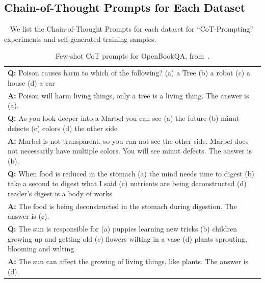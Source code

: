 \documentclass{article} %
\begin{document}
\subsection{Chain-of-Thought Prompts for Each Dataset}~\label{sec:app_prompt}
We list the Chain-of-Thought Prompts for each dataset for ``CoT-Prompting'' experiments and self-generated training samples.


\begin{table}[h]
    \caption{
    Few-shot CoT prompts for OpenBookQA, from~\cite{Wang2022RationaleAugmentedEI}.
    }
    \centering
    \small
    \begin{tabular}{p{14cm}}
        \toprule
        \textbf{Q:} Poison causes harm to which of the following? (a) a Tree (b) a robot (c) a house (d) a car\\
        \vspace{-1mm}
        \textbf{A:} Poison will harm living things, only a tree is a living thing. The answer is (a).\\
        \vspace{0mm}
        \textbf{Q:} As you look deeper into a Marbel you can see (a) the future (b) minut defects (c) colors (d) the other side\\
        \vspace{-1mm}
        \textbf{A:} Marbel is not transparent, so you can not see the other side. Marbel does not necessarily have multiple colors. You will see minut defects. The answer is (b). \\
        \vspace{0mm}
        \textbf{Q:} When food is reduced in the stomach (a) the mind needs time to digest (b) take a second to digest what I said (c) nutrients are being deconstructed (d) reader's digest is a body of works\\
        \vspace{-1mm}
        \textbf{A:} The food is being deconstructed in the stomach during digestion. The answer is (c).\\
        \vspace{0mm}
        \textbf{Q:} The sun is responsible for (a) puppies learning new tricks (b) children growing up and getting old (c) flowers wilting in a vase (d) plants sprouting, blooming and wilting\\
        \vspace{-1mm}
        \textbf{A:} The sun can affect the growing of living things, like plants. The answer is (d).\\
        \bottomrule
    \end{tabular}
    \label{tab:prompt-obqa}
\end{table}
\end{document}
